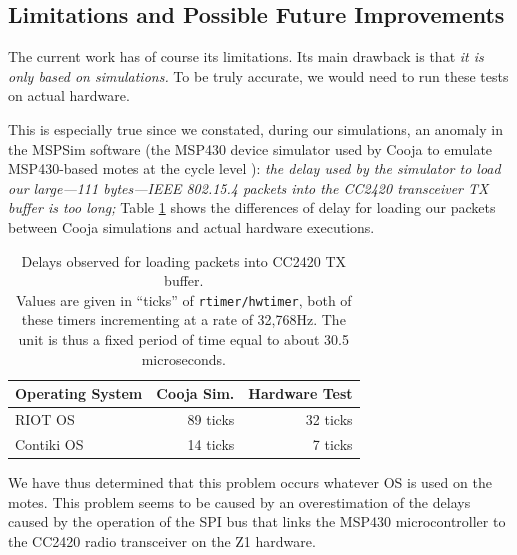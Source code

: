 \documentclass[conference]{IEEEtran}
\begin{document}
\subsection{Limitations and Possible Future Improvements}
\label{SectLimits}

The current work has of course its limitations. Its main drawback is that
\emph{it is only based on simulations.} To be truly accurate, we would need
to run these tests on actual hardware.

This is especially true since we constated, during our simulations,
an anomaly in the MSPSim software (the MSP430 device simulator used by Cooja
to emulate MSP430-based motes at the cycle level \cite{MSPSim}):
\emph{the delay used by the simulator to load our large---111 bytes---IEEE
802.15.4 packets into the CC2420 transceiver TX buffer is too long;} Table
\ref{TblTXPktLoadDelays} shows the differences of delay for loading
our packets between Cooja simulations and actual hardware executions.

\begin{table}
\centering
\begin{tabular}{|l|r|r|}
\hline
Operating System     &  Cooja Sim.  & Hardware Test \\
\hline
RIOT OS              &   89 ticks   &  32 ticks \\ 
Contiki OS           &   14 ticks   &   7 ticks \\
\hline
\end{tabular}
\caption{Delays observed for loading packets into CC2420 TX buffer.\\
Values are given in ``ticks'' of \texttt{rtimer/hwtimer}, both of these
timers incrementing at a rate of 32,768Hz. The unit is thus a fixed period
of time equal to about 30.5 microseconds.}
\label{TblTXPktLoadDelays}
\end{table}

We have thus determined that this problem occurs whatever OS is used
on the motes. This problem seems to be caused by an overestimation
of the delays caused by the operation of the SPI bus that links
the MSP430 microcontroller to the CC2420 radio transceiver
on the Z1 hardware.
\end{document}
